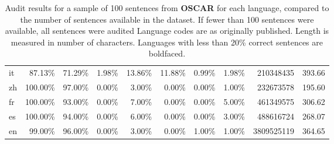 \begin{table*}[hbt!]
{\begin{tabular}{l|rrrr|rrr|rr}
            it           & 87.13\%  & 71.29\%  & 1.98\% & 13.86\% & 11.88\%  & 0.99\%   & 1.98\% & 210348435    & 393.66     \\
            zh           & 100.00\% & 97.00\%  & 0.00\% & 3.00\%  & 0.00\%   & 0.00\%   & 1.00\% & 232673578    & 195.60     \\
            fr           & 100.00\% & 93.00\%  & 0.00\% & 7.00\%  & 0.00\%   & 0.00\%   & 5.00\% & 461349575    & 306.62     \\
            es           & 100.00\% & 94.00\%  & 0.00\% & 6.00\%  & 0.00\%   & 0.00\%   & 3.00\% & 488616724    & 268.07     \\
            en           & 99.00\%  & 96.00\%  & 0.00\% & 3.00\%  & 0.00\%   & 1.00\%   & 1.00\% & 3809525119   & 364.65     \\
            \bottomrule
        \end{tabular}%
    }
    \caption{Audit results for a sample of 100 sentences from \textbf{OSCAR} for each language, compared to the number of sentences available in the dataset. If fewer than 100 sentences were available, all sentences were audited Language codes are as originally published. Length is measured in number of characters. Languages with less than 20\% correct sentences are boldfaced.}
    \label{tab:oscar-full}
\end{table*}